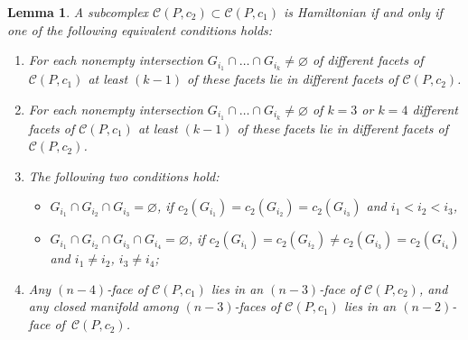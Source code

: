 \documentclass[12pt]{amsart}
\newtheorem{lemma}[formula]{Lemma}
\theoremstyle{definition}
\theoremstyle{remark}
\begin{document}
\begin{lemma}\label{lem:Hamsc}
A subcomplex $\mathcal{C}(P,c_2)\subset \mathcal{C}(P,c_1)$ is Hamiltonian if and only if
one of the following equivalent conditions holds:
\begin{enumerate}
\item For each nonempty intersection $G_{i_1}\cap \dots\cap G_{i_k}\ne\varnothing$ of different facets 
of $\mathcal{C}(P,c_1)$ at least $(k-1)$ of these facets lie in different facets of $\mathcal{C}(P,c_2)$.
\item For each nonempty intersection $G_{i_1}\cap \dots\cap G_{i_k}\ne\varnothing$ of $k=3$ or $k=4$ 
different facets of $\mathcal{C}(P,c_1)$ at least $(k-1)$ of these facets lie in different facets of $\mathcal{C}(P,c_2)$.
\item The following two conditions hold:
\begin{itemize}
\item $G_{i_1}\cap G_{i_2}\cap G_{i_3}=\varnothing$, if $c_2(G_{i_1})=c_2(G_{i_2})=c_2(G_{i_3})$ and 
$i_1<i_2<i_3$,  
\item $G_{i_1}\cap G_{i_2}\cap G_{i_3}\cap G_{i_4}=\varnothing$, if 
$c_2(G_{i_1})=c_2(G_{i_2})\ne c_2(G_{i_3})=c_2(G_{i_4})$ and 
$i_1\ne i_2$, $i_3\ne i_4$;
\end{itemize} 
\item Any $(n-4)$-face of $\mathcal{C}(P,c_1)$ lies in an $(n-3)$-face of $\mathcal{C}(P,c_2)$,
and any closed manifold among $(n-3)$-faces of $\mathcal{C}(P,c_1)$ lies in an $(n-2)$-face of~$\mathcal{C}(P,c_2)$. 
\end{enumerate}
\end{lemma}
\end{document}
